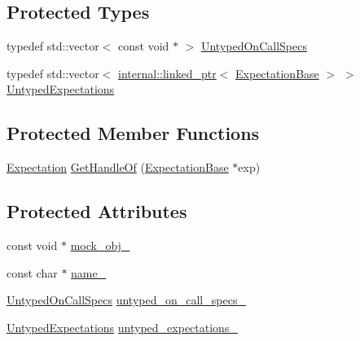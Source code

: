 \subsection*{Protected Types}
\begin{DoxyCompactItemize}
\item 
typedef std\+::vector$<$ const void $\ast$ $>$ \hyperlink{classtesting_1_1internal_1_1UntypedFunctionMockerBase_a29cc87ed60ad0218432aa777abba7dbb}{Untyped\+On\+Call\+Specs}
\item 
typedef std\+::vector$<$ \hyperlink{classtesting_1_1internal_1_1linked__ptr}{internal\+::linked\+\_\+ptr}$<$ \hyperlink{classtesting_1_1internal_1_1ExpectationBase}{Expectation\+Base} $>$ $>$ \hyperlink{classtesting_1_1internal_1_1UntypedFunctionMockerBase_a36480bd395e110b4eae5b0d0402de966}{Untyped\+Expectations}
\end{DoxyCompactItemize}
\subsection*{Protected Member Functions}
\begin{DoxyCompactItemize}
\item 
\hyperlink{classtesting_1_1Expectation}{Expectation} \hyperlink{classtesting_1_1internal_1_1UntypedFunctionMockerBase_a7705611c4a63df16cddb0674878c403a}{Get\+Handle\+Of} (\hyperlink{classtesting_1_1internal_1_1ExpectationBase}{Expectation\+Base} $\ast$exp)
\end{DoxyCompactItemize}
\subsection*{Protected Attributes}
\begin{DoxyCompactItemize}
\item 
const void $\ast$ \hyperlink{classtesting_1_1internal_1_1UntypedFunctionMockerBase_adf35c589969bb985668616031cb9ed56}{mock\+\_\+obj\+\_\+}
\item 
const char $\ast$ \hyperlink{classtesting_1_1internal_1_1UntypedFunctionMockerBase_a2d472077b9a8d3758caaec5770259f70}{name\+\_\+}
\item 
\hyperlink{classtesting_1_1internal_1_1UntypedFunctionMockerBase_a29cc87ed60ad0218432aa777abba7dbb}{Untyped\+On\+Call\+Specs} \hyperlink{classtesting_1_1internal_1_1UntypedFunctionMockerBase_aed2a1913f6c03fd47c8900039556be34}{untyped\+\_\+on\+\_\+call\+\_\+specs\+\_\+}
\item 
\hyperlink{classtesting_1_1internal_1_1UntypedFunctionMockerBase_a36480bd395e110b4eae5b0d0402de966}{Untyped\+Expectations} \hyperlink{classtesting_1_1internal_1_1UntypedFunctionMockerBase_aae4a42a4bace1fcb0cd4bdf1ddd40277}{untyped\+\_\+expectations\+\_\+}
\end{DoxyCompactItemize}


